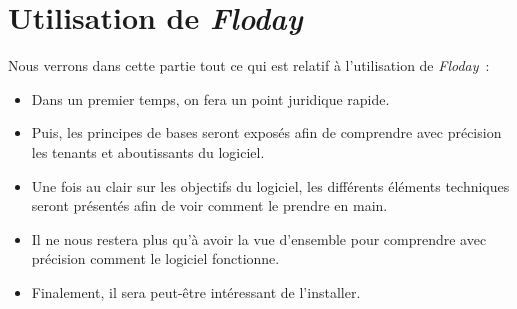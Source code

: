 \section{Utilisation de \emph{Floday}}

\begin{intro}
	Nous verrons dans cette partie tout ce qui est relatif à l'utilisation de \emph{Floday}~:
	\begin{itemize}
		\item Dans un premier temps, on fera un point juridique rapide.
		\item Puis, les principes de bases seront exposés afin de comprendre avec précision les tenants et aboutissants du logiciel.
		\item Une fois au clair sur les objectifs du logiciel, les différents éléments techniques seront présentés afin de voir comment le prendre en main.
		\item Il ne nous restera plus qu'à avoir la vue d'ensemble pour comprendre avec précision comment le logiciel fonctionne.
		\item Finalement, il sera peut-être intéressant de l'installer.
	\end{itemize}
\end{intro}








